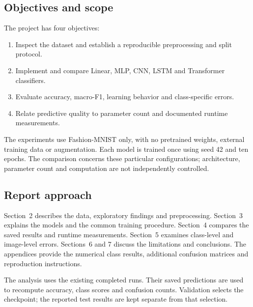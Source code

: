 \subsection{Objectives and scope}
The project has four objectives:
\begin{enumerate}
\item Inspect the dataset and establish a reproducible preprocessing and split protocol.
\item Implement and compare Linear, MLP, CNN, LSTM and Transformer classifiers.
\item Evaluate accuracy, macro-F1, learning behavior and class-specific errors.
\item Relate predictive quality to parameter count and documented runtime measurements.
\end{enumerate}

The experiments use Fashion-MNIST only, with no pretrained weights, external
training data or augmentation. Each model is trained once using seed 42 and ten
epochs. The comparison concerns these particular configurations; architecture,
parameter count and computation are not independently controlled.

\subsection{Report approach}
Section~2 describes the data, exploratory findings and preprocessing.
Section~3 explains the models and the common training procedure.
Section~4 compares the saved results and runtime measurements.
Section~5 examines class-level and image-level errors.
Sections~6 and 7 discuss the limitations and conclusions.
The appendices provide the numerical class results, additional confusion matrices
and reproduction instructions.

The analysis uses the existing completed runs. Their saved predictions are used
to recompute accuracy, class scores and confusion counts. Validation selects
the checkpoint; the reported test results are kept separate from that selection.
